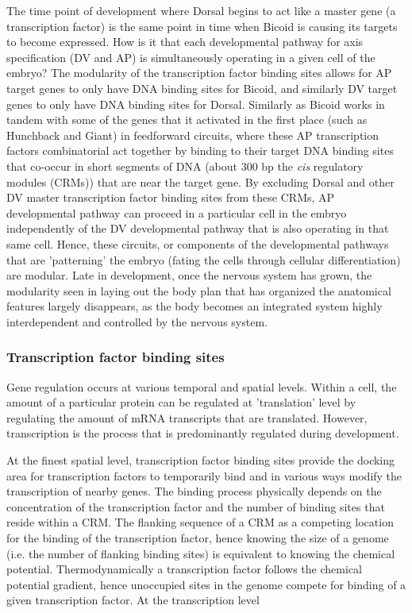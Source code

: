  The time point of development where Dorsal begins to act like a master gene (a transcription factor) is the same point in time when Bicoid is causing its targets to become expressed.  How is it that each developmental pathway for axis specification (DV and AP) is simultaneously operating in a given cell of the embryo?  The modularity of the transcription factor binding sites allows for AP target genes to only have DNA binding sites for Bicoid, and similarly DV target genes to only have DNA binding sites for Dorsal.  Similarly as Bicoid works in tandem with some of the genes that it activated in the first place (such as Hunchback and Giant) in feedforward circuits, where these AP transcription factors combinatorial act together by binding to their target DNA binding sites that co-occur in short segments of DNA (about 300 bp the \textit{cis} regulatory modules (CRMs)) that are near the target gene.  By excluding Dorsal and other DV master transcription factor binding sites from these CRMs, AP developmental pathway can proceed in a particular cell in the embryo independently of the DV developmental pathway that is also operating in that same cell.  Hence, these circuits, or components of the developmental pathways that are 'patterning' the embryo (fating the cells through cellular differentiation) are modular.  Late in development, once the nervous system has grown, the modularity seen in laying out the body plan that has organized the anatomical features largely disappears, as the body becomes an integrated system highly interdependent and controlled by the nervous system.

\subsubsection{Transcription factor binding sites}
Gene regulation occurs at various temporal and spatial levels.  Within a cell, the amount of a particular protein can be regulated at 'translation' level by regulating the amount of mRNA transcripts that are translated.  However, transcription is the process that is predominantly regulated during development.  

At the finest spatial level, transcription factor binding sites provide the docking area for transcription factors to temporarily bind and in various ways modify the transcription of nearby genes.  The binding process physically depends on the concentration of the transcription factor and the number of binding sites that reside within a CRM.  The flanking sequence of a CRM as a competing location for the binding of the transcription factor, hence knowing the size of a genome (i.e. the number of flanking binding sites) is equivalent to knowing the chemical potential.  Thermodynamically a transcription factor follows the chemical potential gradient, hence unoccupied sites in the genome compete for binding of a given transcription factor.  At the transcription level


